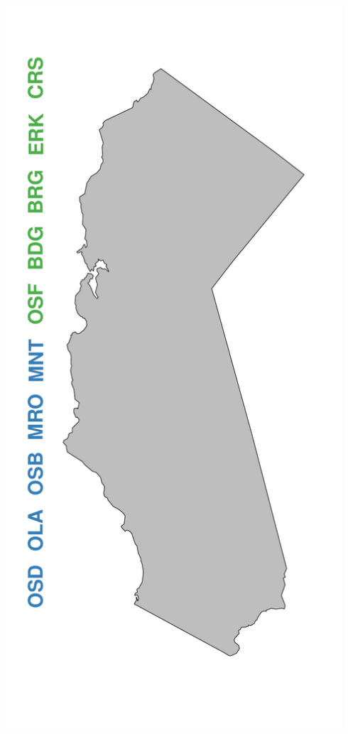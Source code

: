 \documentclass[a0paper,portrait]{baposter}
\begin{document}
\begin{poster}
{\begin{minipage}[h!]{0.19\textwidth}
	        \includegraphics[width=0.94\textwidth]{../pictures/mapFullHalfHalf.pdf}
	\end{minipage}
	\begin{minipage}[h!]{0.19\textwidth}
	        \hspace*{0.125cm}

\end{minipage}}
\end{poster}
\end{document}
